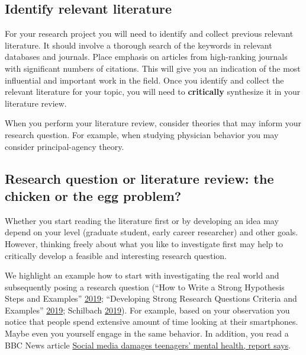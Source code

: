 \documentclass[
]{book}
\begin{document}
\hypertarget{identify-relevant-literature}{%
\subsection{Identify relevant
literature}\label{identify-relevant-literature}}

For your research project you will need to identify and collect previous
relevant literature. It should involve a thorough search of the keywords
in relevant databases and journals. Place emphasis on articles from
high-ranking journals with significant numbers of citations. This will
give you an indication of the most influential and important work in the
field. Once you identify and collect the relevant literature for your
topic, you will need to \textbf{critically} synthesize it in your
literature review.

When you perform your literature review, consider theories that may
inform your research question. For example, when studying physician
behavior you may consider principal-agency theory.

\hypertarget{research-question-or-literature-review-the-chicken-or-the-egg-problem}{%
\subsection{Research question or literature review: the chicken or the
egg
problem?}\label{research-question-or-literature-review-the-chicken-or-the-egg-problem}}

Whether you start reading the literature first or by developing an idea
may depend on your level (graduate student, early career researcher) and
other goals. However, thinking freely about what you like to investigate
first may help to critically develop a feasible and interesting research
question.

We highlight an example how to start with investigating the real world
and subsequently posing a research question (``How to Write a Strong
Hypothesis Steps and Examples''
\protect\hyperlink{ref-noauthor_how_2019}{2019}; ``Developing Strong
Research Questions Criteria and Examples''
\protect\hyperlink{ref-noauthor_developing_2019}{2019}; Schilbach
\protect\hyperlink{ref-schilbach_5_2019}{2019}). For example, based on
your observation you notice that people spend extensive amount of time
looking at their smartphones. Maybe even you yourself engage in the same
behavior. In addition, you read a BBC News article
\href{https://www.bbc.com/news/technology-55826238}{Social media damages
teenagers' mental health, report says}.
\end{document}
